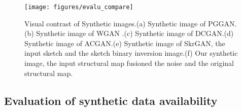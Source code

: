\documentclass[runningheads]{llncs}
\begin{document}
\begin{figure}
	\centering
	\texttt{[image: figures/evalu\_compare]}
	\caption{Visual contrast of Synthetic images.(a) Synthetic image of PGGAN\cite{100karras2017progressive}.(b) Synthetic image of WGAN \cite{99arjovsky2017wasserstein}.(c) Synthetic image of DCGAN\cite{97radford2015unsupervised}.(d) Synthetic image of ACGAN\cite{98odena2016conditional}.(e) Synthetic image of SkrGAN\cite{96zhang2019skrgan:}, the input sketch and the sketch binary inversion image.(f) Our synthetic image, the input structural map fusioned the noise and the original structural map.}
	\label{evalu_compare}
\end{figure}

\subsection{Evaluation of synthetic data availability}
\end{document}
